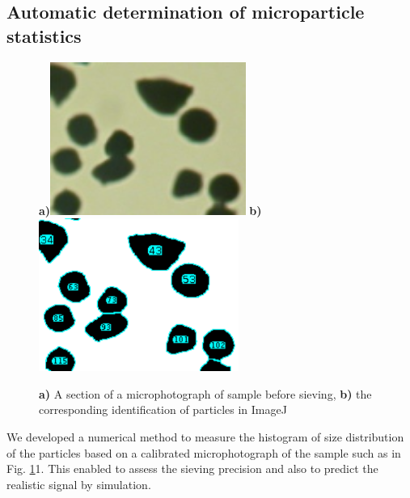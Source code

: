 \subsection{Automatic determination of microparticle statistics}
\begin{figure}[ht] \caption{\textbf{a)} A section of a microphotograph of sample before sieving, \textbf{b)} the corresponding identification of particles in ImageJ} \label{fg_microphoto} \centering 
\textbf{a)}\includegraphics[height=5cm]{img/technology/imagej_photo.pdf}
\textbf{b)}\includegraphics[height=5cm]{img/technology/imagej_found.pdf}
\end{figure}

We developed a numerical method to measure the histogram of size distribution of the particles based on a calibrated microphotograph of the sample such as in Fig. \ref{fg_microphoto}1. This enabled to assess the sieving precision and also to predict the realistic signal by simulation.

